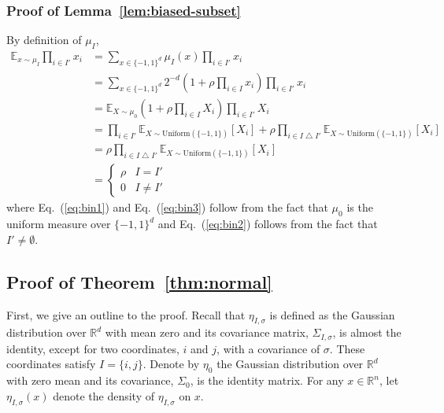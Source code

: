 \documentclass[final, 12pt]{colt2018}
\renewcommand{\eqref}[1]{Eq.~(\ref{#1})}
\begin{document}
\subsubsection{Proof of Lemma~\ref{lem:biased-subset}} \label{sec:pr-biased}

By definition of $\mu_I$,
\begin{align}
\mathbb{E}_{x\sim \mu_{I}} \prod_{i\in I'} x_i
&= \sum_{x \in \{-1,1\}^d} \mu_I(x) \prod_{i\in I'} x_i \nonumber\\
&= \sum_{x \in \{-1,1\}^d} 2^{-d} (1+ \rho\prod_{i\in I} x_i) \prod_{i\in I'} x_i \nonumber\\
&= \mathbb{E}_{X \sim \mu_0} (1+ \rho\prod_{i\in I} X_i) \prod_{i\in I'} X_i \label{eq:bin1}\\
&= \prod_{i\in I'} \mathbb{E}_{X \sim \mathrm{Uniform}(\{-1,1\})} \left[X_i \right]
+ \rho \prod_{i\in I \bigtriangleup I'} \mathbb{E}_{X \sim \mathrm{Uniform}(\{-1,1\})} \left[X_i \right] \label{eq:bin3}\\
&= \rho \prod_{i\in I \bigtriangleup I'} \mathbb{E}_{X \sim \mathrm{Uniform}(\{-1,1\})} \left[X_i \right] \label{eq:bin2}\\
&=\begin{cases}
\rho & I=I' \\
0 & I \ne I'
\end{cases} \nonumber
\end{align}
where \eqref{eq:bin1} and \eqref{eq:bin3} follow from the fact that $\mu_0$ is the uniform measure over $\{-1,1\}^d$ and \eqref{eq:bin2} follows from the fact that $I' \ne \emptyset$.



\subsection{Proof of Theorem~\ref{thm:normal}} \label{sec:pr-normal}

First, we give an outline to the proof. Recall that $\eta_{I,\sigma}$ is defined as the Gaussian distribution over $\mathbb{R}^d$ with mean zero and its covariance matrix, $\Sigma_{I,\sigma}$, is almost the identity, except for two coordinates, $i$ and $j$, with a covariance of $\sigma$. These coordinates satisfy $I = \{i,j\}$. Denote by $\eta_0$ the Gaussian distribution over $\mathbb{R}^d$ with zero mean and its covariance, $\Sigma_0$, is the identity matrix. For any $x \in \mathbb{R}^n$, let $\eta_{I,\sigma}(x)$ denote the density of $\eta_{I,\sigma}$ on $x$.
\end{document}
